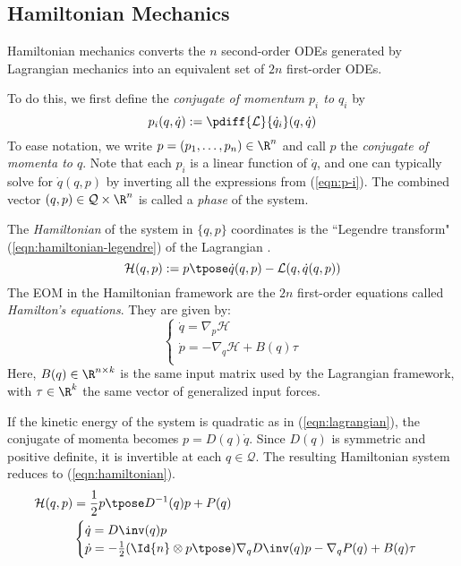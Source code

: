 \subsection{Hamiltonian Mechanics}
Hamiltonian mechanics converts the \(n\) second-order ODEs generated by
Lagrangian mechanics into an equivalent set of \(2n\) first-order ODEs.

To do this, we first define the \textit{conjugate of momentum \(p_i\) to \(q_i\)} by
\begin{equation}\label{eqn:p-i}
    p_i(q,\dot{q}) := \pdiff{\mathcal{L}}{\dot{q}_i}(q,\dot{q})
\end{equation}
To ease notation, we write \(p = (p_1, \ldots, p_n) \in \R^n\) and call
\(p\) the \textit{conjugate of momenta to \(q\)}.
Note that each \(p_i\) is a linear function of \(\dot{q}\), and one can typically
solve for \(\dot{q}(q,p)\) by inverting all the expressions from (\ref{eqn:p-i}).
The combined vector \((q,p) \in \mathcal{Q}\times\R^n\) is called a 
\textit{phase} of the system. 

The \textit{Hamiltonian} of the system in
\(\{q,p\}\) coordinates is the ``Legendre transform"
(\ref{eqn:hamiltonian-legendre}) of the Lagrangian \cite{landau_mechanics}.
\begin{equation}\label{eqn:hamiltonian-legendre}
    \mathcal{H}(q,p) := p\tpose \dot{q}(q,p) - \mathcal{L}(q,\dot{q}(q,p))
\end{equation}
The EOM in the Hamiltonian framework are the \(2n\)
first-order equations called \textit{Hamilton's equations}. They are given by:
\begin{equation}\label{eqn:hamiltons-eqns}
    \begin{cases}
        \dot{q} = \nabla_p\mathcal{H} \\
        \dot{p} = -\nabla_q\mathcal{H} + B(q)\tau \\
    \end{cases}
\end{equation}
Here, \(B(q) \in \R^{n\times k}\) is the same input matrix used by the
Lagrangian framework, with \(\tau \in \R^k\) the same vector of generalized
input forces.

If the kinetic energy of the system is quadratic as in (\ref{eqn:lagrangian}), 
the conjugate of momenta becomes \(p = D(q)\dot{q}\). Since \(D(q)\) is symmetric
and positive definite, it is invertible at each \(q \in \mathcal{Q}\).
The resulting Hamiltonian system reduces to (\ref{eqn:hamiltonian}).
\begin{align}\label{eqn:hamiltonian}
    \mathcal{H}(q,p) &= \frac{1}{2} p\tpose D^{-1}(q) p + P(q) \\
                     &\begin{cases}
        \dot{q} = D\inv(q)p \\
        \dot{p} = -\frac{1}{2} (\Id{n} \otimes p\tpose) \nabla_q D\inv(q) p
        - \nabla_q P(q) + B(q) \tau \\
    \end{cases} 
\end{align}

